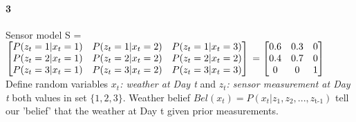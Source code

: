 \documentclass[12pt,a4paper]{article}
\begin{document}
\paragraph{3}
Sensor model S = $\begin{bmatrix} 
P(z_t=1|x_t=1) & P(z_t=1|x_t=2) & P(z_t=1|x_t=3) \\
P(z_t=2|x_t=1) & P(z_t=2|x_t=2) & P(z_t=2|x_t=2) \\
P(z_t=3|x_t=1) & P(z_t=3|x_t=2) & P(z_t=3|x_t=3) \\
\end{bmatrix} \\
= \begin{bmatrix}
0.6 & 0.3 & 0 \\ 0.4 & 0.7 & 0 \\ 0 & 0 & 1
\end{bmatrix}$ \\
Define random variables \textit{$x_t$: weather at Day t} and \textit{$z_t$: sensor measurement at Day t} both values in set $\{1, 2, 3\}$. Weather belief $Bel(x_t)=P(x_t|z_1, z_2, ..., z_\text{t-1})$ tell our 'belief' that the weather at Day t given prior measurements.
\end{document}
